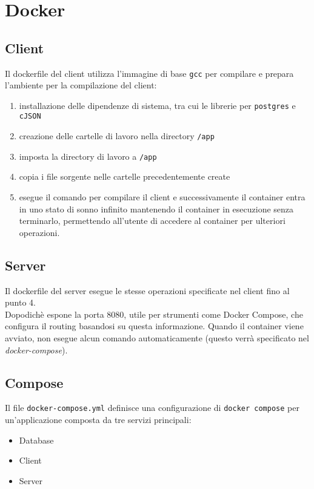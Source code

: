 \documentclass[]{report}
\begin{document}
\chapter{Docker}
\section{Client}
Il dockerfile del client utilizza l'immagine di base \texttt{gcc} per compilare e prepara l'ambiente per la compilazione del client:
\begin{enumerate}
	\item installazione delle dipendenze di sistema, tra cui le librerie per \texttt{postgres} e \texttt{cJSON}
	\item creazione delle cartelle di lavoro nella directory \texttt{/app}
	\item imposta la directory di lavoro a \texttt{/app}
	\item copia i file sorgente nelle cartelle precedentemente create
	\item esegue il comando per compilare il client e successivamente il container entra in uno stato di sonno infinito mantenendo il container in esecuzione senza terminarlo, permettendo all'utente di accedere al container per ulteriori operazioni.
\end{enumerate}

\section{Server}
Il dockerfile del server esegue le stesse operazioni specificate nel client fino al punto 4.\\
Dopodichè espone la porta 8080, utile per strumenti come Docker Compose, che configura il routing basandosi su questa informazione.\sskip
Quando il container viene avviato, non esegue alcun comando automaticamente (questo verrà specificato nel \textit{docker-compose}).

\section{Compose}
Il file \texttt{docker-compose.yml} definisce una configurazione di \texttt{docker compose} per un'applicazione composta da tre servizi principali:
\begin{itemize}
	\item Database
	\item Client
	\item Server
\end{itemize} 
\end{document}
